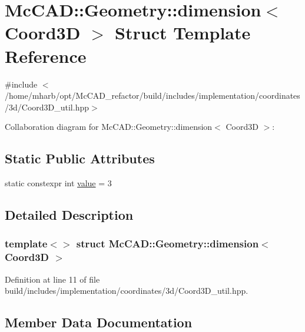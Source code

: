 \hypertarget{structMcCAD_1_1Geometry_1_1dimension_3_01Coord3D_01_4}{}\section{Mc\+C\+AD\+:\+:Geometry\+:\+:dimension$<$ Coord3D $>$ Struct Template Reference}
\label{structMcCAD_1_1Geometry_1_1dimension_3_01Coord3D_01_4}


{\ttfamily \#include $<$/home/mharb/opt/\+Mc\+C\+A\+D\+\_\+refactor/build/includes/implementation/coordinates/3d/\+Coord3\+D\+\_\+util.\+hpp$>$}



Collaboration diagram for Mc\+C\+AD\+:\+:Geometry\+:\+:dimension$<$ Coord3D $>$\+:
\subsection*{Static Public Attributes}
\begin{DoxyCompactItemize}
\item 
static constexpr int \hyperlink{structMcCAD_1_1Geometry_1_1dimension_3_01Coord3D_01_4_a5d3f85f9b6a1f13aee0be9a179dec64b}{value} = 3
\end{DoxyCompactItemize}


\subsection{Detailed Description}
\subsubsection*{template$<$$>$\newline
struct Mc\+C\+A\+D\+::\+Geometry\+::dimension$<$ Coord3\+D $>$}



Definition at line 11 of file build/includes/implementation/coordinates/3d/\+Coord3\+D\+\_\+util.\+hpp.



\subsection{Member Data Documentation}
\mbox{\label{structMcCAD_1_1Geometry_1_1dimension_3_01Coord3D_01_4_a5d3f85f9b6a1f13aee0be9a179dec64b}} 
